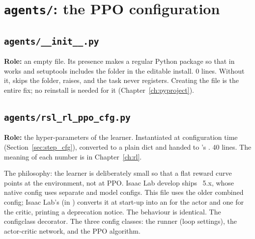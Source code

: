 \chapter{\texttt{agents/}: the PPO configuration}
\label{ch:agents}

\section{\texttt{agents/\_\_init\_\_.py}}

\textbf{Role:} an empty file. Its presence makes  a regular
Python package so that  in
 works and setuptools includes the folder in the
editable install. 0 lines. Without it,  skips the folder,
 raises, and the task never registers. Creating
the file is the entire fix; no reinstall is needed for it
(Chapter~\ref{ch:pyproject}).

\section{\texttt{agents/rsl\_rl\_ppo\_cfg.py}}

\textbf{Role:} the hyper-parameters of the learner. Instantiated at
configuration time (Section~\ref{sec:step_cfg}), converted to a plain dict
and handed to 's . 40 lines. The meaning
of each number is in Chapter~\ref{ch:rl}.


\begin{explain}
 The philosophy: the learner is deliberately small so that a flat
  reward curve points at the environment, not at PPO.
 Isaac Lab develop ships ~5.x, whose native config
  uses separate  and  model configs. This file uses
  the older combined  config; Isaac Lab's
   (in
  ) converts it at
  start-up into an  for the actor and one for the
  critic, printing a deprecation notice. The behaviour is identical.
 The configclass decorator.
 The three config classes: the runner (loop settings), the
  actor-critic network, and the PPO algorithm.
\end{explain}


